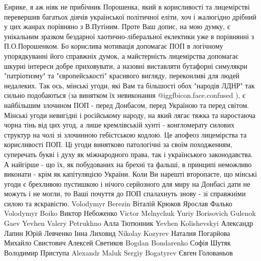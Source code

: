 \begin{itemize}
Енрике, я аж ніяк не прибічник Порошенка, який в корисливості та лицемірстві
перевершив багатьох діячів української політичної еліти, хоч і жалюгідно
дрібний у цих жанрах порівняно з В.Путіним. Проте Ваш допис, на мою думку, є
унікальним зразком бездарної хаотично-ліберальної еклектики уже в порівнянні з
П.О.Порошенком. Бо корислива мотивація допомагає ПОП в логічному упорядкуванні
його справжніх думок, а майстерність лицемірства допомагає шкурні інтереси
добре приховувати, а назовні виставляти бутафорні симулякри "патріотизму" та
"європейськості" красивого вигляду, переконливі для людей недалеких. Так ось,
мінські угоди, які Вам та більшості обох "народів ЛДНР" так сильно подобаються
(за винятком їх невиконання  @igg{fbicon.face.confused} ), є найбільшим злочином ПОП - перед Донбасом,
перед Україною та перед світом. Мінські угоди невигідні і російському народу,
на який лягає тяжка та наростаюча чорна тінь від цих угод, а лише кремлівській
хунті - конгломерату силових структур на чолі зі злочинною гебістською кодлою.
Це апофеоз лицемірства та корисливості ПОП. Ці угоди винятково патологічні за
своїм походженням, суперечать букві і духу як міжнародного права, так і
українського законодавства. А найгірше - що їх, як побудованих на брехні та
фальші, в принципі неможливо виконати - крім як капітуляцією України. Коли Ви
нарешті второпаєте, що мінські угоди є брехливою пустишкою і нічого серйозного
для миру на Донбасі дати не можуть і не могли, то Ваші почуття до ПОП
спалахнуть знову - зі справжніми силою та яскравістю. Volodymyr Berezin Віталій
Крюков Ярослав Фалько Volodymyr Boiko Виктор Небоженко Victor Melnychuk Yuriy
Borisovich Gulenok Gaev Yevhen Valery Petrukhno Алла Тютюнник Yevhen
Kolishevskyi Александр Лапин Юрій Левченко Інна Лиховид Nikolay Kozyrev Наталия
Погарйова Михайло Свистович Алексей Светиков Bogdan Bondarenko Софія Шутяк
Володимир Приступа Alexandr Maluk Sergiy Bogatyrev Євген Голованьов


\end{itemize} %
